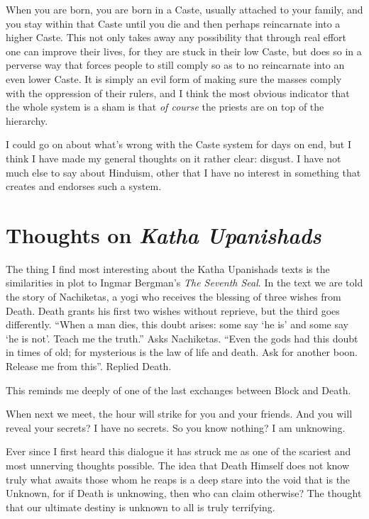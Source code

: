 \documentclass[12pt,letterpaper]{article}
\begin{document}
\begin{spacing}{2}
    When you are born, you are born in a Caste, usually attached to your family,
    and you stay within that Caste until you die and then perhaps reincarnate
    into a higher Caste. This not only takes away any possibility that through
    real effort one can improve their lives, for they are stuck in their low
    Caste, but does so in a perverse way that forces people to still comply so
    as to no reincarnate into an even lower Caste. It is simply an evil form of
    making sure the masses comply with the oppression of their rulers, and I
    think the most obvious indicator that the whole system is a sham is that
    \emph{of course} the priests are on top of the hierarchy.

    I could go on about what's wrong with the Caste system for days on end, but
    I think I have made my general thoughts on it rather clear: disgust. I have
    not much else to say about Hinduism, other that I have no interest in
    something that creates and endorses such a system.

    \newpage
    \section{Thoughts on \emph{Katha Upanishads}}
    The thing I find most interesting about the Katha Upanishads texts is the
    similarities in plot to Ingmar Bergman's \emph{The Seventh Seal}. In the
    text we are told the story of Nachiketas, a yogi who receives the blessing
    of three wishes from Death. Death grants his first two wishes without
    reprieve, but the third goes differently. ``When a man dies, this doubt
    arises: some say `he is' and some say `he is not'. Teach me the truth.''
    Asks Nachiketas. ``Even the gods had this doubt in times of old; for
    mysterious is the law of life and death. Ask for another boon. Release me
    from this''. Replied Death.

    This reminds me deeply of one of the last exchanges between Block and Death.
    \begin{dialogue}
         When next we meet, the hour will strike for you and your friends.
         And you will reveal your secrets?
		 I have no secrets.
		 So you know nothing?
		 I am unknowing.
    \end{dialogue}

	Ever since I first heard this dialogue it has struck me as one of the
	scariest and most unnerving thoughts possible. The idea that Death Himself
	does not know truly what awaits those whom he reaps is a deep stare into
	the void that is the Unknown, for if Death is unknowing, then who can claim
    otherwise? The thought that our ultimate destiny is unknown to all is truly
    terrifying.


\end{spacing}
\end{document}
